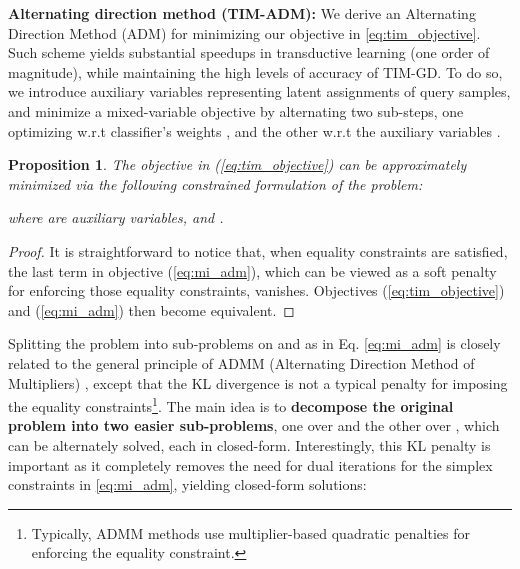 \documentclass{article}
\newtheorem{prop}{Proposition}
\begin{document}
        		
    	    \textbf{Alternating direction method (TIM-ADM): }
        	    We derive an Alternating Direction Method (ADM) for minimizing our objective in \eqref{eq:tim_objective}. Such scheme yields substantial speedups in transductive learning (one order of magnitude), while maintaining the high levels of accuracy of TIM-GD. To do so, we introduce auxiliary variables representing latent assignments of query samples, and minimize a mixed-variable objective by alternating two sub-steps, one optimizing w.r.t classifier's weights , and the other w.r.t the auxiliary variables . 
\begin{prop}\label{prop:mi_adm}
    		        The objective in (\ref{eq:tim_objective}) can be approximately minimized via the following constrained formulation of the problem:
    		        
    		        
where  are auxiliary variables,   and .
    		    \end{prop}
    		    \begin{proof}
    		    It is straightforward to notice that, when equality constraints  are satisfied, the last term in objective (\ref{eq:mi_adm}), which can be viewed as a soft penalty for enforcing those equality constraints,  vanishes. Objectives (\ref{eq:tim_objective}) and (\ref{eq:mi_adm}) then become equivalent.
    		    \end{proof}
    		    Splitting the problem into sub-problems on  and  as in Eq. \eqref{eq:mi_adm} is closely related to the general principle of ADMM (Alternating Direction Method of Multipliers) \cite{boyd}, except that the KL divergence is not a typical penalty for imposing the equality constraints\footnote{Typically, ADMM methods use multiplier-based quadratic penalties for enforcing the equality constraint.}.    		  The main idea is to \textbf{decompose the original problem into two easier sub-problems}, one over  and the other over , which can be alternately solved, each in closed-form. Interestingly, this KL penalty is important as it completely removes the need for dual iterations for the simplex constraints in \eqref{eq:mi_adm}, yielding closed-form solutions:
    		    
\end{document}
